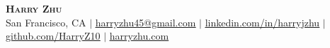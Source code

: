 \pagestyle{fancy}
\fancyhf{} %
\fancyfoot{}
\renewcommand{\headrulewidth}{0pt}
\renewcommand{\footrulewidth}{0pt}

\begin{center}
    \textbf{\Huge\scshape Harry Zhu} \\ \vspace{1pt}
    San Francisco, CA
    $|$ \href{mailto:harryzhu45@gmail.com}{\underline{harryzhu45@gmail.com}}
    $|$ \href{https://linkedin.com/in/harryjzhu}{\underline{linkedin.com/in/harryjzhu}}
    $|$ \href{https://github.com/HarryZ10}{\underline{github.com/HarryZ10}}
    $|$ \href{https://harryzhu.com}{\underline{harryzhu.com}}
\end{center}
